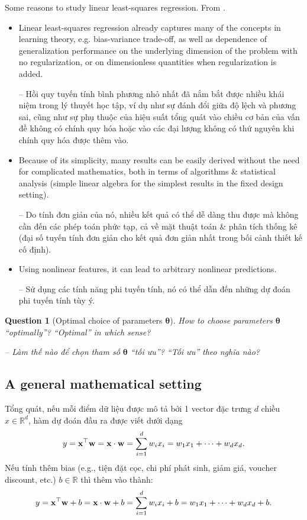 \documentclass{article}
\newtheorem{question}{Question}
\begin{document}
{\sf Some reasons to study linear least-squares regression.} From \cite[Sect. 3.1, pp. 45--46]{Bach2024}.
\begin{itemize}
	\item Linear least-squares regression already captures many of the concepts in learning theory, e.g. bias-variance trade-off, as well as dependence of generalization performance on the underlying dimension of the problem with no regularization, or on dimensionless quantities when regularization is added.
	
	-- Hồi quy tuyến tính bình phương nhỏ nhất đã nắm bắt được nhiều khái niệm trong lý thuyết học tập, ví dụ như sự đánh đổi giữa độ lệch và phương sai, cũng như sự phụ thuộc của hiệu suất tổng quát vào chiều cơ bản của vấn đề không có chính quy hóa hoặc vào các đại lượng không có thứ nguyên khi chính quy hóa được thêm vào.
	\item Because of its simplicity, many results can be easily derived without the need for complicated mathematics, both in terms of algorithms \& statistical analysis (simple linear algebra for the simplest results in the fixed design setting).
	
	-- Do tính đơn giản của nó, nhiều kết quả có thể dễ dàng thu được mà không cần đến các phép toán phức tạp, cả về mặt thuật toán \& phân tích thống kê (đại số tuyến tính đơn giản cho kết quả đơn giản nhất trong bối cảnh thiết kế cố định).
	\item Using nonlinear features, it can lead to arbitrary nonlinear predictions.
	
	-- Sử dụng các tính năng phi tuyến tính, nó có thể dẫn đến những dự đoán phi tuyến tính tùy ý.
\end{itemize}

\begin{question}[Optimal choice of parameters $\boldsymbol{\theta}$]
	How to choose parameters $\boldsymbol{\theta}$ ``optimally''? ``Optimal'' in which sense?
	
	-- Làm thế nào để chọn tham số $\boldsymbol{\theta}$ ``tối ưu''? ``Tối ưu'' theo nghĩa nào?
\end{question}


\subsection{A general mathematical setting}
Tổng quát, nếu mỗi điểm dữ liệu được mô tả bởi 1 vector đặc trưng $d$ chiều $x\in\mathbb{R}^d$, hàm dự đoán đầu ra được viết dưới dạng
\begin{equation*}
	y = {\bf x}^\top{\bf w} = {\bf x}\cdot{\bf w} = \sum_{i=1}^d w_ix_i = w_1x_1 + \cdots + w_dx_d.
\end{equation*}
Nếu tính thêm bias (e.g., tiện đặt cọc, chi phí phát sinh, giảm giá, voucher discount, etc.) $b\in\mathbb{R}$ thì thêm vào thành:
\begin{equation*}
	y = {\bf x}^\top{\bf w} + b = {\bf x}\cdot{\bf w} + b = \sum_{i=1}^d w_ix_i + b = w_1x_1 + \cdots + w_dx_d + b.
\end{equation*}
\end{document}
